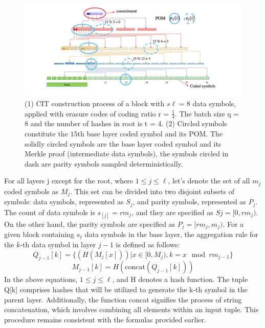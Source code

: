 \begin{center}
	\begin{figure}
		\centering
		\includegraphics[width=0.8\linewidth]{Fig/12/F2}
		\caption{(1) CIT construction process of a block with $s\ell = 8$ data symbols, applied with erasure codes of coding ratio r = $\frac{1}{4}$. The batch size q = 8 and the number of hashes in root is t = 4. (2) Circled symbols constitute the $15$th base layer coded symbol and its POM. The solidly circled symbols are the base layer coded symbol and its Merkle proof (intermediate data symbols), the symbols circled in dash are parity symbols sampled deterministically.
		}
		\label{fig:L12_f2}
	\end{figure}
\end{center}
For all layers j except for the root, where $1 \leq j \leq \ell$, let's denote the set of all $m_{j}$ coded symbols as $M_{j}$. This set can be divided into two disjoint subsets of symbols: data symbols, represented as $S_{j}$, and parity symbols, represented as $P_{j}$. The count of data symbols is $s_[j] = rm_{j}$, and they are specified as $Sj = [0, rm_{j})$. On the other hand, the parity symbols are specified as $P_{j} = [rm_{j}, m_{j})$. For a given block containing $s_{\ell}$ data symbols in the base layer, the aggregation rule for the $k$-th data symbol in layer $j - 1$ is defined as follows:
\begin{equation} 
	Q_{j-1}[k] = \{(H(M_{j}[x])) | x \in [0, M_{j}), k = x \mod rm_{j - 1}\}
\end{equation}
\begin{equation} 
	M_{j-1}[k] = H(\text{concat}(Q_{j-1}[k])) 
\end{equation}
In the above equations, $1 \leq j \leq \ell$, and H denotes a hash function. The tuple Q[k] comprises hashes that will be utilized to generate the k-th symbol in the parent layer. Additionally, the function concat signifies the process of string concatenation, which involves combining all elements within an input tuple. This procedure remains consistent with the formulas provided earlier.\\

